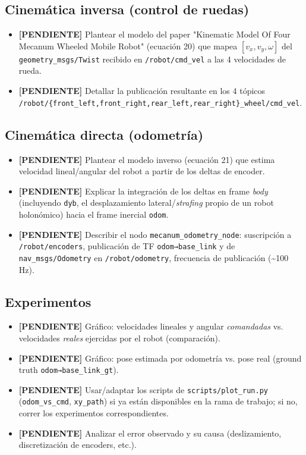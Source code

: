 \documentclass[11pt,a4paper]{article}
\newcommand{\TODO}[1]{\textcolor{todocolor}{\textbf{[PENDIENTE]} #1}}
\newenvironment{tareas}{\begin{itemize}\setlength{\itemsep}{2pt}}{\end{itemize}}
\begin{document}
\subsection{Cinemática inversa (control de ruedas)}
\begin{tareas}
    \item \TODO{Plantear el modelo del paper "Kinematic Model Of Four Mecanum Wheeled Mobile Robot" (ecuación 20) que mapea $[v_x, v_y, \omega]$ del \texttt{geometry\_msgs/Twist} recibido en \texttt{/robot/cmd\_vel} a las 4 velocidades de rueda.}
    \item \TODO{Detallar la publicación resultante en los 4 tópicos \texttt{/robot/\{front\_left,front\_right,rear\_left,rear\_right\}\_wheel/cmd\_vel}.}
\end{tareas}

\subsection{Cinemática directa (odometría)}
\begin{tareas}
    \item \TODO{Plantear el modelo inverso (ecuación 21) que estima velocidad lineal/angular del robot a partir de los deltas de encoder.}
    \item \TODO{Explicar la integración de los deltas en frame \emph{body} (incluyendo \texttt{dyb}, el desplazamiento lateral/\emph{strafing} propio de un robot holonómico) hacia el frame inercial \texttt{odom}.}
    \item \TODO{Describir el nodo \texttt{mecanum\_odometry\_node}: suscripción a \texttt{/robot/encoders}, publicación de TF \texttt{odom→base\_link} y de \texttt{nav\_msgs/Odometry} en \texttt{/robot/odometry}, frecuencia de publicación (\textasciitilde100 Hz).}
\end{tareas}

\subsection{Experimentos}
\begin{tareas}
    \item \TODO{Gráfico: velocidades lineales y angular \emph{comandadas} vs. velocidades \emph{reales} ejercidas por el robot (comparación).}
    \item \TODO{Gráfico: pose estimada por odometría vs. pose real (ground truth \texttt{odom→base\_link\_gt}).}
    \item \TODO{Usar/adaptar los scripts de \texttt{scripts/plot\_run.py} (\texttt{odom\_vs\_cmd}, \texttt{xy\_path}) si ya están disponibles en la rama de trabajo; si no, correr los experimentos correspondientes.}
    \item \TODO{Analizar el error observado y su causa (deslizamiento, discretización de encoders, etc.).}
\end{tareas}
\end{document}

